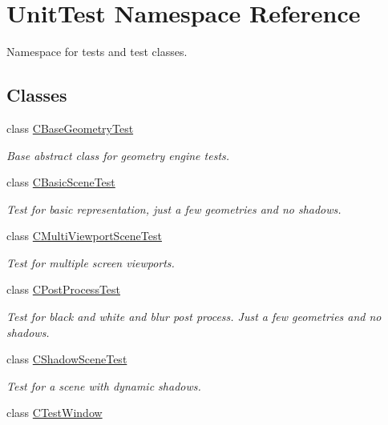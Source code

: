\hypertarget{namespace_unit_test}{}\section{Unit\+Test Namespace Reference}
\label{namespace_unit_test}


Namespace for tests and test classes.  


\subsection*{Classes}
\begin{DoxyCompactItemize}
\item 
class \mbox{\hyperlink{class_unit_test_1_1_c_base_geometry_test}{C\+Base\+Geometry\+Test}}
\begin{DoxyCompactList}\small\item\em Base abstract class for geometry engine tests. \end{DoxyCompactList}\item 
class \mbox{\hyperlink{class_unit_test_1_1_c_basic_scene_test}{C\+Basic\+Scene\+Test}}
\begin{DoxyCompactList}\small\item\em Test for basic representation, just a few geometries and no shadows. \end{DoxyCompactList}\item 
class \mbox{\hyperlink{class_unit_test_1_1_c_multi_viewport_scene_test}{C\+Multi\+Viewport\+Scene\+Test}}
\begin{DoxyCompactList}\small\item\em Test for multiple screen viewports. \end{DoxyCompactList}\item 
class \mbox{\hyperlink{class_unit_test_1_1_c_post_process_test}{C\+Post\+Process\+Test}}
\begin{DoxyCompactList}\small\item\em Test for black and white and blur post process. Just a few geometries and no shadows. \end{DoxyCompactList}\item 
class \mbox{\hyperlink{class_unit_test_1_1_c_shadow_scene_test}{C\+Shadow\+Scene\+Test}}
\begin{DoxyCompactList}\small\item\em Test for a scene with dynamic shadows. \end{DoxyCompactList}\item 
class \mbox{\hyperlink{class_unit_test_1_1_c_test_window}{C\+Test\+Window}}

\end{DoxyCompactItemize}
